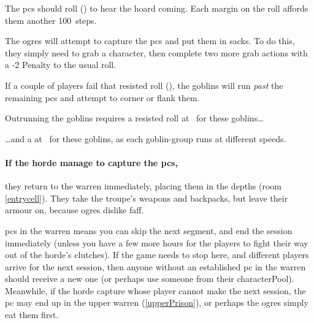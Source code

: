 The \glspl{pc} should roll  (\tn[5]) to hear the hoard coming.
Each margin on the roll affords them another 100~\glspl{step}.



The \glspl{ogre} will attempt to capture the \glspl{pc} and put them in sacks.
To do this, they simply need to grab a character,%
then complete two more grab actions with a -2 Penalty to the usual roll.

If a couple of players fail that resisted  roll (\tn), the goblins will run \emph{past} the remaining \glspl{pc} and attempt to corner or flank them.%


Outrunning the goblins requires a resisted  roll at \tn\ for these goblins\ldots


\ldots and a  at \tn\ for these goblins, as each goblin-group runs at different speeds.



\paragraph{If the horde manage to capture the \glspl{pc},}
they return to the \gls{warren} immediately, placing them in the depths (room \vref{entrycell}).
They take the troupe's weapons and backpacks, but leave their armour on, because \glspl{ogre} dislike faff.

\Glspl{pc} in the \gls{warren} means you can skip the next \gls{segment}, and end the session immediately (unless you have a few more hours for the players to fight their way out of the horde's clutches).
If the game needs to stop here, and different players arrive for the next session, then anyone without an established \gls{pc} in the \gls{warren} should receive a new one (or perhaps use someone from their \gls{characterPool}).
Meanwhile, if the horde capture  whose player cannot make the next session, the \gls{pc} may end up in the upper warren (\vref{upperPrison}), or perhaps the \glspl{ogre} simply eat them first.

